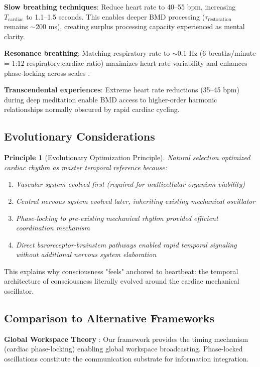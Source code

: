 \documentclass[12pt]{article}
\newtheorem{principle}[theorem]{Principle}
\theoremstyle{remark}
\begin{document}
\textbf{Slow breathing techniques}: Reduce heart rate to 40--55 bpm, increasing $T_{\text{cardiac}}$ to 1.1--1.5 seconds. This enables deeper BMD processing ($\tau_{\text{restoration}}$ remains $\sim$200 ms), creating surplus processing capacity experienced as mental clarity.

\textbf{Resonance breathing}: Matching respiratory rate to $\sim$0.1 Hz (6 breaths/minute = 1:12 respiratory:cardiac ratio) maximizes heart rate variability and enhances phase-locking across scales \citep{lehrer2000heart}.

\textbf{Transcendental experiences}: Extreme heart rate reductions (35--45 bpm) during deep meditation enable BMD access to higher-order harmonic relationships normally obscured by rapid cardiac cycling.

\subsection{Evolutionary Considerations}

\begin{principle}[Evolutionary Optimization Principle]
Natural selection optimized cardiac rhythm as master temporal reference because:
\begin{enumerate}
\item Vascular system evolved first (required for multicellular organism viability)
\item Central nervous system evolved later, inheriting existing mechanical oscillator
\item Phase-locking to pre-existing mechanical rhythm provided efficient coordination mechanism
\item Direct baroreceptor-brainstem pathways enabled rapid temporal signaling without additional nervous system elaboration
\end{enumerate}
\end{principle}

This explains why consciousness "feels" anchored to heartbeat: the temporal architecture of consciousness literally evolved around the cardiac mechanical oscillator.

\subsection{Comparison to Alternative Frameworks}

\textbf{Global Workspace Theory} \citep{baars1988cognitive}: Our framework provides the timing mechanism (cardiac phase-locking) enabling global workspace broadcasting. Phase-locked oscillations constitute the communication substrate for information integration.
\end{document}
